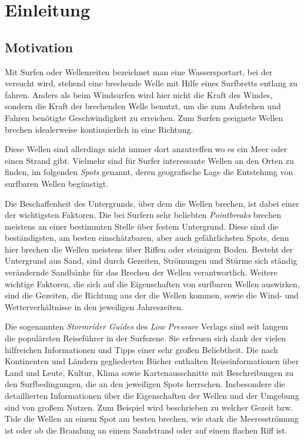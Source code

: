 
\section{Einleitung}

\subsection{Motivation}

Mit Surfen oder Wellenreiten bezeichnet man eine Wassersportart, bei
der versucht wird, stehend eine brechende Welle mit Hilfe eines
Surfbretts entlang zu fahren. Anders als beim Windsurfen wird hier
nicht die Kraft des Windes, sondern die Kraft der brechenden Welle
benutzt, um die zum Aufstehen und Fahren benötigte Geschwindigkeit zu
erreichen. Zum Surfen geeignete Wellen brechen idealerweise
kontinuierlich in eine Richtung.

Diese Wellen sind allerdings nicht immer dort anzutreffen wo es ein
Meer oder einen Strand gibt. Vielmehr sind für Surfer interessante
Wellen an den Orten zu finden, im folgenden \textit{Spots} genannt,
deren geografische Lage die Entstehung von surfbaren Wellen
begünstigt.

Die Beschaffenheit des Untergrunds, über dem die Wellen brechen, ist
dabei einer der wichtigsten Faktoren. Die bei Surfern sehr beliebten
\textit{Pointbreaks} brechen meistens an einer bestimmten Stelle über
festem Untergrund. Diese sind die beständigsten, am besten
einschätzbaren, aber auch gefährlichsten Spots, denn hier brechen die
Wellen meistens über Riffen oder steinigem Boden. Besteht der
Untergrund aus Sand, sind durch Gezeiten, Strömungen und Stürme sich
ständig verändernde Sandbänke für das Brechen der Wellen
verantwortlich. Weitere wichtige Faktoren, die sich auf die
Eigenschaften von surfbaren Wellen auswirken, sind die Gezeiten, die
Richtung aus der die Wellen kommen, sowie die Wind- und
Wetterverhältnisse in den jeweiligen Jahreszeiten.

Die sogenannten \textit{Stormrider Guides} des \textit{Low Pressure}
Verlags sind seit langem die populärsten Reiseführer in der
Surfszene. Sie erfreuen sich dank der vielen hilfreichen Informationen
und Tipps einer sehr großen Beliebtheit. Die nach Kontinenten und
Ländern gegliederten Bücher enthalten Reiseinformationen über Land und
Leute, Kultur, Klima sowie Kartenausschnitte mit Beschreibungen zu den
Surfbedingungen, die an den jeweiligen Spots herrschen. Insbesondere
die detaillierten Informationen über die Eigenschaften der Wellen und
der Umgebung sind von großem Nutzen. Zum Beispiel wird beschrieben zu
welcher Gezeit bzw. Tide die Wellen an einem Spot am besten brechen,
wie stark die Meeresströmung ist oder ob die Brandung an einem
Sandstrand oder auf einem flachen Riff ist.

% 

